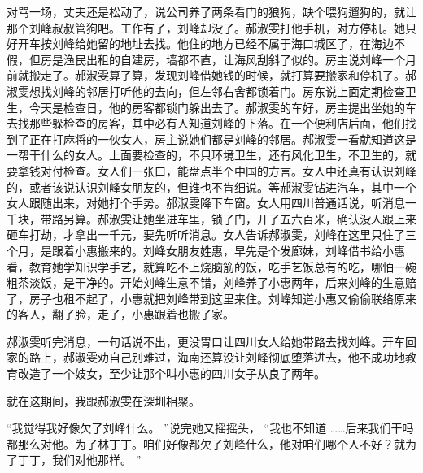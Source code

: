 \documentclass[12pt,twoside,openany]{book}
\begin{document}
对骂一场，丈夫还是松动了，说公司养了两条看门的狼狗，缺个喂狗遛狗的，就让那个刘峰叔叔管狗吧。工作有了，刘峰却没了。郝淑雯打他手机，对方停机。她只好开车按刘峰给她留的地址去找。他住的地方已经不属于海口城区了，在海边不假，但房是渔民出租的自建房，墙都不直，让海风刮斜了似的。房主说刘峰一个月前就搬走了。郝淑雯算了算，发现刘峰借她钱的时候，就打算要搬家和停机了。郝淑雯想找刘峰的邻居打听他的去向，但左邻右舍都锁着门。房东说上面定期检查卫生，今天是检查日，他的房客都锁门躲出去了。郝淑雯的车好，房主提出坐她的车去找那些躲检查的房客，其中必有人知道刘峰的下落。在一个便利店后面，他们找到了正在打麻将的一伙女人，房主说她们都是刘峰的邻居。郝淑雯一看就知道这是一帮干什么的女人。上面要检查的，不只环境卫生，还有风化卫生，不卫生的，就要拿钱对付检查。女人们一张口，能盘点半个中国的方言。女人中还真有认识刘峰的，或者该说认识刘峰女朋友的，但谁也不肯细说。等郝淑雯钻进汽车，其中一个女人跟随出来，对她打个手势。郝淑雯降下车窗。女人用四川普通话说，听消息一千块，带路另算。郝淑雯让她坐进车里，锁了门，开了五六百米，确认没人跟上来砸车打劫，才拿出一千元，要先听听消息。女人告诉郝淑雯，刘峰在这里只住了三个月，是跟着小惠搬来的。刘峰女朋友姓惠，早先是个发廊妹，刘峰借书给小惠看，教育她学知识学手艺，就算吃不上烧脑筋的饭，吃手艺饭总有的吃，哪怕一碗粗茶淡饭，是干净的。开始刘峰生意不错，刘峰养了小惠两年，后来刘峰的生意赔了，房子也租不起了，小惠就把刘峰带到这里来住。刘峰知道小惠又偷偷联络原来的客人，翻了脸，走了，小惠跟着也搬了家。

郝淑雯听完消息，一句话说不出，更没胃口让四川女人给她带路去找刘峰。开车回家的路上，郝淑雯劝自己别难过，海南还算没让刘峰彻底堕落进去，他不成功地教育改造了一个妓女，至少让那个叫小惠的四川女子从良了两年。

就在这期间，我跟郝淑雯在深圳相聚。

“我觉得我好像欠了刘峰什么。 ”说完她又摇摇头， “我也不知道 ……后来我们干吗都那么对他。为了林丁丁。咱们好像都欠了刘峰什么，他对咱们哪个人不好？就为了丁丁，我们对他那样。 ”
\end{document}
